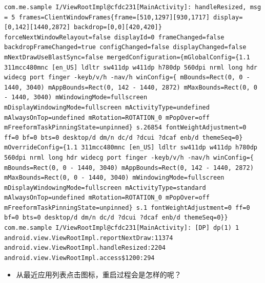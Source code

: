 \documentclass[9pt, b5paper]{article}
\begin{document}
\begin{verbatim}
com.me.sample I/ViewRootImpl@cfdc231[MainActivity]: handleResized, msg = 5 frames=ClientWindowFrames{frame=[510,1297][930,1717] display=[0,142][1440,2872] backdrop=[0,0][420,420]} forceNextWindowRelayout=false displayId=0 frameChanged=false backdropFrameChanged=true configChanged=false displayChanged=false mNextDrawUseBlastSync=false mergedConfiguration={mGlobalConfig={1.1 311mcc480mnc [en_US] ldltr sw411dp w411dp h780dp 560dpi nrml long hdr widecg port finger -keyb/v/h -nav/h winConfig={ mBounds=Rect(0, 0 - 1440, 3040) mAppBounds=Rect(0, 142 - 1440, 2872) mMaxBounds=Rect(0, 0 - 1440, 3040) mWindowingMode=fullscreen mDisplayWindowingMode=fullscreen mActivityType=undefined mAlwaysOnTop=undefined mRotation=ROTATION_0 mPopOver=off mFreeformTaskPinningState=unpinned} s.26854 fontWeightAdjustment=0 ff=0 bf=0 bts=0 desktop/d dm/n dc/d ?dcui ?dcaf enb/d themeSeq=0} mOverrideConfig={1.1 311mcc480mnc [en_US] ldltr sw411dp w411dp h780dp 560dpi nrml long hdr widecg port finger -keyb/v/h -nav/h winConfig={ mBounds=Rect(0, 0 - 1440, 3040) mAppBounds=Rect(0, 142 - 1440, 2872) mMaxBounds=Rect(0, 0 - 1440, 3040) mWindowingMode=fullscreen mDisplayWindowingMode=fullscreen mActivityType=standard mAlwaysOnTop=undefined mRotation=ROTATION_0 mPopOver=off mFreeformTaskPinningState=unpinned} s.1 fontWeightAdjustment=0 ff=0 bf=0 bts=0 desktop/d dm/n dc/d ?dcui ?dcaf enb/d themeSeq=0}}
com.me.sample I/ViewRootImpl@cfdc231[MainActivity]: [DP] dp(1) 1 android.view.ViewRootImpl.reportNextDraw:11374 android.view.ViewRootImpl.handleResized:2204 android.view.ViewRootImpl.access$1200:294
\end{verbatim}
\begin{itemize}
\item 从最近应用列表点击图标，重启过程会是怎样的呢？
\end{itemize}
\end{document}
